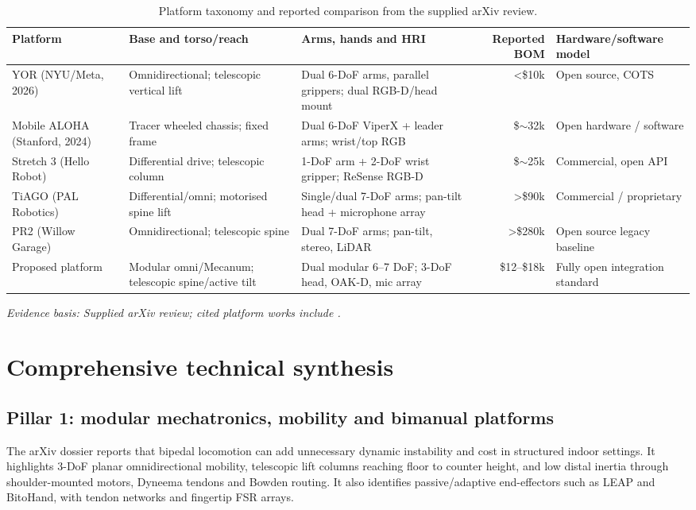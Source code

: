 \documentclass[10pt,a4paper]{article}
\newcommand{\evidence}[1]{\par\noindent\footnotesize\color{gray}\emph{Evidence basis: #1}\normalsize\par}
\begin{document}
\begin{table}[ht]
\centering\small
\caption{Platform taxonomy and reported comparison from the supplied arXiv review.}
\label{tab:platforms}
\begin{tabularx}{\textwidth}{@{}lYYrY@{}}
\toprule
Platform & Base and torso/reach & Arms, hands and HRI & Reported BOM & Hardware/software model \\
\midrule
YOR (NYU/Meta, 2026) & Omnidirectional; telescopic vertical lift & Dual 6-DoF arms, parallel grippers; dual RGB-D/head mount & <\$10k & Open source, COTS \\
Mobile ALOHA (Stanford, 2024) & Tracer wheeled chassis; fixed frame & Dual 6-DoF ViperX + leader arms; wrist/top RGB & \$\(\sim\)32k & Open hardware / software \\
Stretch 3 (Hello Robot) & Differential drive; telescopic column & 1-DoF arm + 2-DoF wrist gripper; ReSense RGB-D & \$\(\sim\)25k & Commercial, open API \\
TiAGO (PAL Robotics) & Differential/omni; motorised spine lift & Single/dual 7-DoF arms; pan-tilt head + microphone array & >\$90k & Commercial / proprietary \\
PR2 (Willow Garage) & Omnidirectional; telescopic spine & Dual 7-DoF arms; pan-tilt, stereo, LiDAR & >\$280k & Open source legacy baseline \\
Proposed platform & Modular omni/Mecanum; telescopic spine/active tilt & Dual modular 6--7 DoF; 3-DoF head, OAK-D, mic array & \$12--\$18k & Fully open integration standard \\
\bottomrule
\end{tabularx}
\evidence{Supplied arXiv review; cited platform works include \cite{yor,mobilealoha,stretch}.}
\end{table}

\section{Comprehensive technical synthesis}
\subsection{Pillar 1: modular mechatronics, mobility and bimanual platforms}
The arXiv dossier reports that bipedal locomotion can add unnecessary dynamic instability and cost in structured indoor settings. It highlights 3-DoF planar omnidirectional mobility, telescopic lift columns reaching floor to counter height, and low distal inertia through shoulder-mounted motors, Dyneema tendons and Bowden routing. It also identifies passive/adaptive end-effectors such as LEAP and BitoHand, with tendon networks and fingertip FSR arrays.\cite{yor,stretch}
\end{document}
